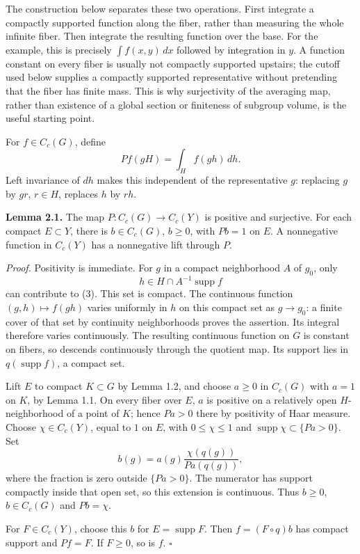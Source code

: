 \documentclass[
  english,
  11pt,
  a4paper,
]{article}
\begin{document}
The construction below separates these two operations. First integrate a
compactly supported function along the fiber, rather than measuring the
whole infinite fiber. Then integrate the resulting function over the
base. For the example, this is precisely \(\int f(x,y)\,dx\) followed by
integration in \(y\). A function constant on every fiber is usually not
compactly supported upstairs; the cutoff used below supplies a compactly
supported representative without pretending that the fiber has finite
mass. This is why surjectivity of the averaging map, rather than
existence of a global section or finiteness of subgroup volume, is the
useful starting point.

For \(f\in C_c(G)\), define \[Pf(gH)=\int_H f(gh)\,dh.
\tag{3}\] Left invariance of \(dh\) makes this independent of the
representative \(g\): replacing \(g\) by \(gr\), \(r\in H\), replaces
\(h\) by \(rh\).

\textbf{Lemma 2.1.} The map \(P:C_c(G)\to C_c(Y)\) is positive and
surjective. For each compact \(E\subset Y\), there is \(b\in C_c(G)\),
\(b\geq0\), with \(Pb=1\) on \(E\). A nonnegative function in \(C_c(Y)\)
has a nonnegative lift through \(P\).

\emph{Proof.} Positivity is immediate. For \(g\) in a compact
neighborhood \(A\) of \(g_0\), only
\[h\in H\cap A^{-1}\operatorname{supp}f\] can contribute to (3). This
set is compact. The continuous function \((g,h)\mapsto f(gh)\) varies
uniformly in \(h\) on this compact set as \(g\to g_0\): a finite cover
of that set by continuity neighborhoods proves the assertion. Its
integral therefore varies continuously. The resulting continuous
function on \(G\) is constant on fibers, so descends continuously
through the quotient map. Its support lies in
\(q(\operatorname{supp}f)\), a compact set.

Lift \(E\) to compact \(K\subset G\) by Lemma 1.2, and choose \(a\geq0\)
in \(C_c(G)\) with \(a=1\) on \(K\), by Lemma 1.1. On every fiber over
\(E\), \(a\) is positive on a relatively open \(H\)-neighborhood of a
point of \(K\); hence \(Pa>0\) there by positivity of Haar measure.
Choose \(\chi\in C_c(Y)\), equal to \(1\) on \(E\), with
\(0\leq\chi\leq1\) and \(\operatorname{supp}\chi\subset\{Pa>0\}\). Set
\[b(g)=a(g)\frac{\chi(q(g))}{Pa(q(g))},
\tag{4}\] where the fraction is zero outside \(\{Pa>0\}\). The numerator
has support compactly inside that open set, so this extension is
continuous. Thus \(b\geq0\), \(b\in C_c(G)\) and \(Pb=\chi\).

For \(F\in C_c(Y)\), choose this \(b\) for \(E=\operatorname{supp}F\).
Then \(f=(F\circ q)b\) has compact support and \(Pf=F\). If \(F\geq0\),
so is \(f\). \(\square\)
\end{document}
